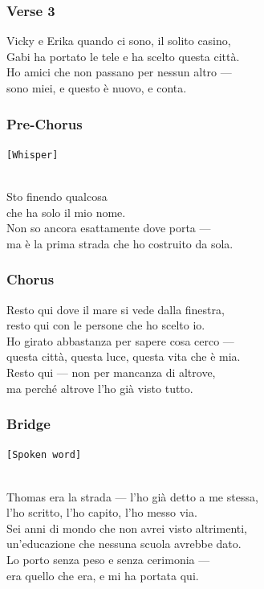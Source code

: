 \subsubsection{Verse 3}\label{verse-3-10}

Vicky e Erika quando ci sono, il solito casino,\\
Gabi ha portato le tele e ha scelto questa città.\\
Ho amici che non passano per nessun altro ---\\
sono miei, e questo è nuovo, e conta.

\subsubsection{Pre-Chorus}\label{pre-chorus-32}

\texttt{{[}Whisper{]}}\strut \\
Sto finendo qualcosa\\
che ha solo il mio nome.\\
Non so ancora esattamente dove porta ---\\
ma è la prima strada che ho costruito da sola.

\subsubsection{Chorus}\label{chorus-47}

Resto qui dove il mare si vede dalla finestra,\\
resto qui con le persone che ho scelto io.\\
Ho girato abbastanza per sapere cosa cerco ---\\
questa città, questa luce, questa vita che è mia.\\
Resto qui --- non per mancanza di altrove,\\
ma perché altrove l'ho già visto tutto.

\subsubsection{Bridge}\label{bridge-14}

\texttt{{[}Spoken\ word{]}}\strut \\
Thomas era la strada --- l'ho già detto a me stessa,\\
l'ho scritto, l'ho capito, l'ho messo via.\\
Sei anni di mondo che non avrei visto altrimenti,\\
un'educazione che nessuna scuola avrebbe dato.\\
Lo porto senza peso e senza cerimonia ---\\
era quello che era, e mi ha portata qui.

